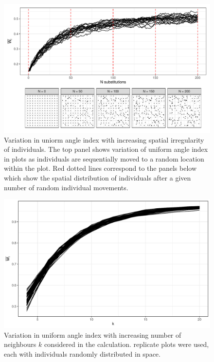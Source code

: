\documentclass[11pt,a4paper]{article}
\begin{document}
\begin{figure}
\centering
	\includegraphics[width=\linewidth]{wi_diagram}
	\caption{Variation in uniorm angle index with increasing spatial irregularity of individuals. The top panel shows variation of uniform angle index in \wireps{} plots as individuals are sequentially moved to a random location within the plot. Red dotted lines correspond to the panels below which show the spatial distribution of individuals after a given number of random individual movements.}
	\label{wi_diagram}
\end{figure}

\begin{figure}
\centering
	\includegraphics[width=\linewidth]{wi_k}
	\caption{Variation in uniform angle index with increasing number of neighbours $k$ considered in the calculation. \wikn{} replicate plots were used, each with \wiki{} individuals randomly distributed in space.}
	\label{wi_k}
\end{figure}
\end{document}
